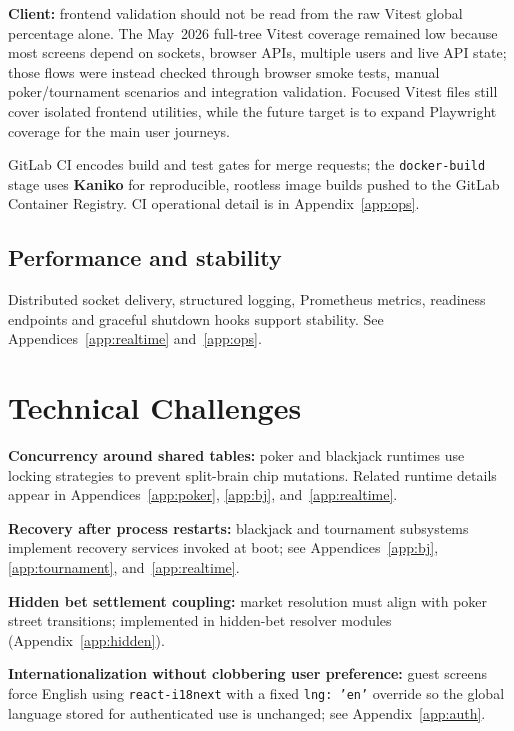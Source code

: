 \documentclass[11pt,a4paper]{article}
\begin{document}
\noindent
\textbf{Client:} frontend validation should not be read from the raw Vitest global percentage alone. The May~2026 full-tree Vitest coverage remained low because most screens depend on sockets, browser APIs, multiple users and live API state; those flows were instead checked through browser smoke tests, manual poker/tournament scenarios and integration validation. Focused Vitest files still cover isolated frontend utilities, while the future target is to expand Playwright coverage for the main user journeys.

\noindent
GitLab CI encodes build and test gates for merge requests; the \texttt{docker-build} stage uses \textbf{Kaniko} for reproducible, rootless image builds pushed to the GitLab Container Registry. CI operational detail is in Appendix~\ref{app:ops}.

\subsection{Performance and stability}

Distributed socket delivery, structured logging, Prometheus metrics, readiness endpoints and graceful shutdown hooks support stability. See Appendices~\ref{app:realtime} and~\ref{app:ops}.

\section{Technical Challenges}
\label{sec:challenges}

\textbf{Concurrency around shared tables:} poker and blackjack runtimes use locking strategies to prevent split-brain chip mutations. Related runtime details appear in Appendices~\ref{app:poker}, \ref{app:bj}, and~\ref{app:realtime}.

\textbf{Recovery after process restarts:} blackjack and tournament subsystems implement recovery services invoked at boot; see Appendices~\ref{app:bj}, \ref{app:tournament}, and~\ref{app:realtime}.

\textbf{Hidden bet settlement coupling:} market resolution must align with poker street transitions; implemented in hidden-bet resolver modules (Appendix~\ref{app:hidden}).

\textbf{Internationalization without clobbering user preference:} guest screens force English using \texttt{react-i18next} with a fixed \texttt{lng: 'en'} override so the global language stored for authenticated use is unchanged; see Appendix~\ref{app:auth}.
\end{document}
